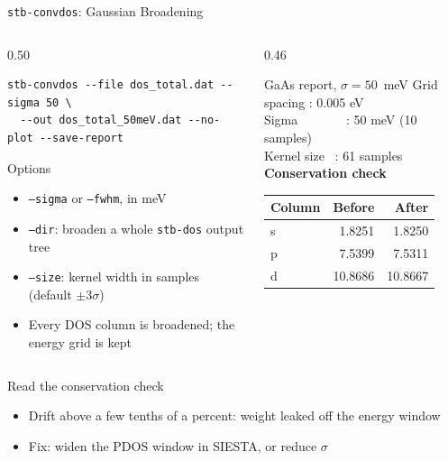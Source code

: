 \documentclass[8pt]{beamer}
\begin{document}
\begin{frame}[fragile]{\texttt{stb-convdos}: Gaussian Broadening}
	\begin{columns}[T]
		\begin{column}{0.50\textwidth}
			{\scriptsize
\begin{verbatim}
stb-convdos --file dos_total.dat --sigma 50 \
  --out dos_total_50meV.dat --no-plot --save-report
\end{verbatim}
			}
			\begin{block}{Options}
				\begin{itemize}
					\item \texttt{--sigma} or \texttt{--fwhm}, in meV
					\item \texttt{--dir}: broaden a whole \texttt{stb-dos} output tree
					\item \texttt{--size}: kernel width in samples (default $\pm3\sigma$)
					\item Every DOS column is broadened; the energy grid is kept
				\end{itemize}
			\end{block}
		\end{column}
		\begin{column}{0.46\textwidth}
			\begin{block}{GaAs report, $\sigma = 50$~meV}
				\ttfamily\scriptsize
				Grid spacing : 0.005 eV\\
				Sigma \ \ \ \ \ \ \ : 50 meV (10 samples)\\
				Kernel size \ : 61 samples\\[4pt]
				\normalfont\textbf{Conservation check}\\[2pt]
				\begin{tabular}{lrr}
					\toprule
					Column & Before & After \\
					\midrule
					s & 1.8251 & 1.8250 \\
					p & 7.5399 & 7.5311 \\
					d & 10.8686 & 10.8667 \\
					\bottomrule
				\end{tabular}
			\end{block}
		\end{column}
	\end{columns}
	\vspace{0.2cm}
	\begin{alertblock}{Read the conservation check}
		\small
		\begin{itemize}
			\item Drift above a few tenths of a percent: weight leaked off the energy window
			\item Fix: widen the PDOS window in SIESTA, or reduce $\sigma$
		\end{itemize}
	\end{alertblock}
\end{frame}
\end{document}

